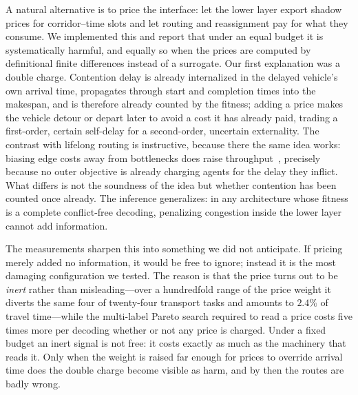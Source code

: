 \documentclass[manuscript,screen,review]{acmart}
\begin{document}
A natural alternative is to price the interface: let the lower layer export
shadow prices for corridor--time slots and let routing and reassignment pay for
what they consume. We implemented this and report that under an equal budget it
is systematically harmful, and equally so when the prices are computed by
definitional finite differences instead of a surrogate. Our first explanation
was a double charge. Contention delay is already internalized in
the delayed vehicle's own arrival time, propagates through start and completion
times into the makespan, and is therefore already counted by the fitness; adding
a price makes the vehicle detour or depart later to avoid a cost it has already
paid, trading a first-order, certain self-delay for a second-order, uncertain
externality. The contrast with lifelong routing is instructive, because there the
same idea works: biasing edge costs away from bottlenecks does raise
throughput~\cite{zhang2024guidance}, precisely because no outer objective is
already charging agents for the delay they inflict. What differs is not the
soundness of the idea but whether contention has been counted once
already. The inference generalizes: in any architecture whose fitness is a
complete conflict-free decoding, penalizing congestion inside the lower layer
cannot add information.

The measurements sharpen this into something we did not anticipate. If pricing
merely added no information, it would be free to ignore; instead it is the
most damaging configuration we tested. The reason is that the price turns out to
be \emph{inert} rather than misleading---over a hundredfold range of the price
weight it diverts the same four of twenty-four transport tasks and amounts to
$2.4\%$ of travel time---while the multi-label Pareto search required to read a
price costs five times more per decoding whether or not any price is charged.
Under a fixed budget an inert signal is not free: it costs exactly as much as the
machinery that reads it. Only when the weight is raised far enough for prices to
override arrival time does the double charge become visible as harm, and by then
the routes are badly wrong.
\end{document}

